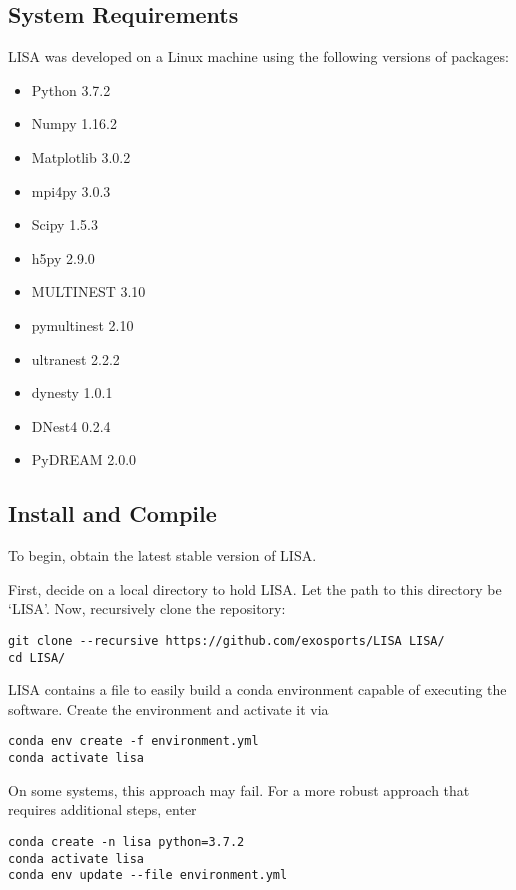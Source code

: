 \documentclass[letterpaper, 12pt]{article}
\begin{document}
\subsection{System Requirements}
\label{sec:requirements}

\noindent LISA was developed on a Linux machine using the following 
versions of packages:

\begin{itemize}
\item Python 3.7.2
\item Numpy 1.16.2
\item Matplotlib 3.0.2
\item mpi4py 3.0.3
\item Scipy 1.5.3
\item h5py 2.9.0
\item MULTINEST 3.10
\item pymultinest 2.10
\item ultranest 2.2.2
\item dynesty 1.0.1
\item DNest4 0.2.4
\item PyDREAM 2.0.0
\end{itemize}


\subsection{Install and Compile}
\label{sec:install}

\noindent To begin, obtain the latest stable version of LISA.  \newline

\noindent First, decide on a local directory to hold LISA.  Let the path to this 
directory be `LISA'.  Now, recursively clone the repository:
\begin{verbatim}
git clone --recursive https://github.com/exosports/LISA LISA/
cd LISA/
\end{verbatim}

\noindent LISA contains a file to easily build a conda environment capable of 
executing the software.  Create the environment and activate it via

\begin{verbatim}
conda env create -f environment.yml
conda activate lisa
\end{verbatim}

\noindent On some systems, this approach may fail.  For a more robust approach that 
requires additional steps, enter

\begin{verbatim}
conda create -n lisa python=3.7.2
conda activate lisa
conda env update --file environment.yml
\end{verbatim}
\end{document}
